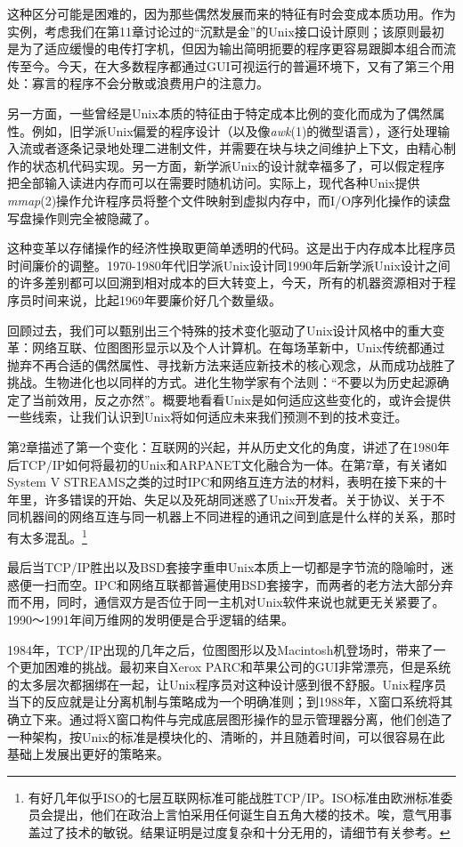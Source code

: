 \documentclass[12pt,oneside]{book}
\begin{document}
这种区分可能是困难的，因为那些偶然发展而来的特征有时会变成本质功用。作为实例，考虑我们在第11章讨论过的“沉默是金”的Unix接口设计原则；该原则最初是为了适应缓慢的电传打字机，但因为输出简明扼要的程序更容易跟脚本组合而流传至今。今天，在大多数程序都通过GUI可视运行的普遍环境下，又有了第三个用处：寡言的程序不会分散或浪费用户的注意力。

另一方面，一些曾经是Unix本质的特征由于特定成本比例的变化而成为了偶然属性。例如，旧学派Unix偏爱的程序设计（以及像\textit{awk}(1)的微型语言），逐行处理输入流或者逐条记录地处理二进制文件，并需要在块与块之间维护上下文，由精心制作的状态机代码实现。另一方面，新学派Unix的设计就幸福多了，可以假定程序把全部输入读进内存而可以在需要时随机访问。实际上，现代各种Unix提供\textit{mmap}(2)操作允许程序员将整个文件映射到虚拟内存中，而I/O序列化操作的读盘写盘操作则完全被隐藏了。

这种变革以存储操作的经济性换取更简单透明的代码。这是出于内存成本比程序员时间廉价的调整。1970-1980年代旧学派Unix设计同1990年后新学派Unix设计之间的许多差别都可以回溯到相对成本的巨大转变上，今天，所有的机器资源相对于程序员时间来说，比起1969年要廉价好几个数量级。

回顾过去，我们可以甄别出三个特殊的技术变化驱动了Unix设计风格中的重大变革：网络互联、位图图形显示以及个人计算机。在每场革新中，Unix传统都通过抛弃不再合适的偶然属性、寻找新方法来适应新技术的核心观念，从而成功战胜了挑战。生物进化也以同样的方式。进化生物学家有个法则：“不要以为历史起源确定了当前效用，反之亦然”。概要地看看Unix是如何适应这些变化的，或许会提供一些线索，让我们认识到Unix将如何适应未来我们预测不到的技术变迁。

第2章描述了第一个变化：互联网的兴起，并从历史文化的角度，讲述了在1980年后TCP/IP如何将最初的Unix和ARPANET文化融合为一体。在第7章，有关诸如System V STREAMS之类的过时IPC和网络互连方法的材料，表明在接下来的十年里，许多错误的开始、失足以及死胡同迷惑了Unix开发者。关于协议、关于不同机器间的网络互连与同一机器上不同进程的通讯之间到底是什么样的关系，那时有太多混乱。\footnote{有好几年似乎ISO的七层互联网标准可能战胜TCP/IP。ISO标准由欧洲标准委员会提出，他们在政治上言怕采用任何诞生自五角大楼的技术。唉，意气用事盖过了技术的敏锐。结果证明是过度复杂和十分无用的，请细节有关参考\cite{Padlipsky}。}

最后当TCP/IP胜出以及BSD套接字重申Unix本质上一切都是字节流的隐喻时，迷惑便一扫而空。IPC和网络互联都普遍使用BSD套接字，而两者的老方法大部分弃而不用，同时，通信双方是否位于同一主机对Unix软件来说也就更无关紧要了。1990～1991年间万维网的发明便是合乎逻辑的结果。

1984年，TCP/IP出现的几年之后，位图图形以及Macintosh机登场时，带来了一个更加困难的挑战。最初来自Xerox PARC和苹果公司的GUI非常漂亮，但是系统的太多层次都捆绑在一起，让Unix程序员对这种设计感到很不舒服。Unix程序员当下的反应就是让分离机制与策略成为一个明确准则；到1988年，X窗口系统将其确立下来。通过将X窗口构件与完成底层图形操作的显示管理器分离，他们创造了一种架构，按Unix的标准是模块化的、清晰的，并且随着时间，可以很容易在此基础上发展出更好的策略来。
\end{document}
